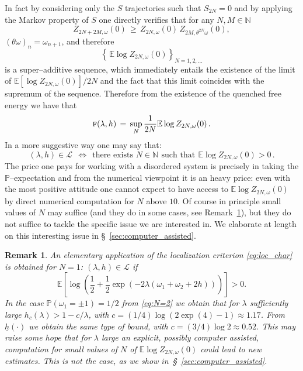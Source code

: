 \documentclass[reqno,11pt]{amsart}
\numberwithin{equation}{section}
\newtheorem{rem}[theorem]{Remark}
\newcommand{\N}{\mathbb{N}}
\newcommand{\cL}{{\ensuremath{\mathcal L}} }
\newcommand{\bbE}{{\ensuremath{\mathbb E}} }
\newcommand{\bbP}{{\ensuremath{\mathbb P}} }
\newcommand{\go}{\omega}
\newcommand{\gl}{\lambda}
\newcommand{\tf}{\textsc{f}}
\begin{document}
 In fact by considering only the $S$ trajectories such that $S_{2N}=0$ and by applying
 the Markov property of $S$ one directly verifies
  that for any $N, M\in \N$
 \begin{equation}
 \label{eq:superadd}
 Z_{2N+2M, \go} (0)\, \ge \, Z_{2N, \go}(0)\, Z_{2M, \theta^{2N} \go}(0),
 \end{equation}
 $(\theta \go)_n=\go_{n+1}$,
 and therefore
 \begin{equation}
 \left\{ \, \bbE\log Z_{2N, \go} (0)
 \right\}_{N=1,2, \ldots}
  \end{equation}
  is a super--additive sequence, which immediately entails
  the existence of the limit of $ \bbE[\log Z_{2N, \go}(0)]/2N$ and the fact that
  this limit coincides with the supremum of the sequence.
  Therefore from the existence of the quenched free energy we have that
  \begin{equation}
  \tf(\gl, h) \, =\, \sup_N \frac 1{2N} \bbE\log Z_{2N, \go}(0)\,.
  \end{equation}
In a more suggestive way one may say that:
\begin{equation}
\label{eq:loc_char}
(\gl, h) \in \cL \  \  \Longleftrightarrow  \ \
\text{there exists } N\in \N \ \, \text{such that} \,  \  \bbE\log Z_{2N, \go}(0)>0\,.
\end{equation}
The price one pays for working with a disordered system
is precisely in taking the $\bbP$--expectation
and from the numerical viewpoint it is an heavy price:
even with the most positive attitude one cannot expect
to have access to  $\bbE\log Z_{2N, \go}(0)$
by direct numerical computation for $N$ above $10$.
Of course in principle small values of $N$ may suffice
(and they do in some cases, see Remark~\ref{rem:N=2}), but they do not
suffice to tackle the specific issue we are interested in.
We elaborate at length on this interesting issue in \S~\ref{sec:computer_assisted}.
\smallskip

\begin{rem}
\label{rem:N=2}
\rm
An elementary application of the localization criterion \eqref{eq:loc_char} is
obtained for $N=1$: $(\gl, h)\in \cL$ if
\begin{equation}
\label{eq:N=2}
\bbE\left[
\log\left(
\frac 12+ \frac 12 \exp\left(
-2\gl \left(\go_1+ \go_2+2h\right)
\right)
\right)
\right]>0.
\end{equation}
In the case $\bbP (\go_1=\pm 1)=1/2$ from
\eqref{eq:N=2}
we obtain that for $\gl$ sufficiently large
$h_c(\gl) > 1- c/\gl$, with $c= (1/4)\log(2\exp(4) -1)\approx1.17$.
From $\underline{h}(\cdot)$ we obtain the same type of bound,
with $c=(3/4)\log 2\approx 0.52$. This may raise some hope that
for $\gl$ large an explicit, possibly computer assisted, computation
for small values of $N$ of $\bbE \log Z_{2N, \go}(0)$ could
lead to new estimates. This is not the case, as we show in~\S~\ref{sec:computer_assisted}.
\end{rem}
\end{document}
